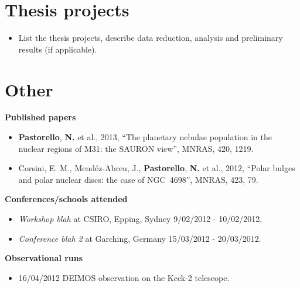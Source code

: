 \documentclass[useAMS,usenatbib,onecolumn]{mn2e}
\begin{document}
\section{Thesis projects}
\label{sec:projects}    

\begin{itemize}
	\item{List the thesis projects, describe data reduction, analysis and preliminary results (if applicable).}
\end{itemize}




\section{Other}
\label{sec:other}         

	\noindent\textbf{Published papers}
	\begin{itemize}
  		\item{\textbf{Pastorello}, \textbf{N.} et al., 2013}, ``The planetary nebulae population in the nuclear regions of M31: the SAURON view'', MNRAS, 420, 1219.
  		\item{Corsini, E. M., Mend\'ez-Abreu, J., \textbf{Pastorello}, \textbf{N.} et al., 2012}, ``Polar bulges and polar nuclear discs: the case of NGC~4698'', MNRAS, 423, 79.	
	\end{itemize}
	


	\noindent\textbf{Conferences/schools attended}
	\begin{itemize}
  		\item{\textit{Workshop blah}} at CSIRO, Epping, Sydney 9/02/2012 - 10/02/2012. 
  		\item{\textit{Conference blah 2}} at Garching, Germany 15/03/2012 - 20/03/2012. 
	\end{itemize}

	\textbf{Observational runs}
	\begin{itemize}
		\item{16/04/2012} DEIMOS observation on the Keck-2 telescope.
	\end{itemize}
\end{document}
